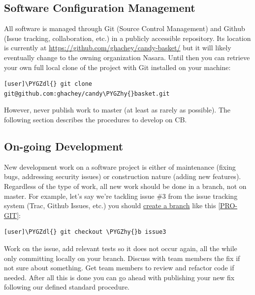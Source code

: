 \documentclass[letterpaper,10pt,english]{sphinxmanual}
\def\PYGZdl{\char`\$}
\def\PYGZhy{\char`\-}
\begin{document}
\subsection{Software Configuration Management}
\label{developer-guide:software-configuration-management}
All software is managed through Git (Source Control Management) and
Github (Issue tracking, collaboration, etc.) in a publicly accessible
repository. Its location is currently at
\href{https://github.com/ghachey/candy-basket/}{https://github.com/ghachey/candy-basket/} but it will likely
eventually change to the owning organization Nasara. Until then you
can retrieve your own full local clone of the project with Git
installed on your machine:

\begin{Verbatim}[commandchars=\\\{\}]
[user]\PYGZdl{} git clone git@github.com:ghachey/candy\PYGZhy{}basket.git
\end{Verbatim}

However, never publish work to master (at least as rarely as
possible). The following section describes the procedures to develop
on CB.


\subsection{On-going Development}
\label{developer-guide:ongoingdev}\label{developer-guide:on-going-development}
New development work on a software project is either of maintenance
(fixing bugs, addressing security issues) or construction nature
(adding new features). Regardless of the type of work, all new work
should be done in a branch, not on master. For example, let's say
we're tackling issue \#3 from the issue tracking system (Trac, Github
Issues, etc.) you should \href{http://www.git-scm.com/book/en/Git-Branching-Basic-Branching-and-Merging}{create a branch}
like this {\hyperref[developer-guide:pro-git]{{[}PRO-GIT{]}}}:

\begin{Verbatim}[commandchars=\\\{\}]
[user]\PYGZdl{} git checkout \PYGZhy{}b issue3
\end{Verbatim}

Work on the issue, add relevant tests so it does not occur again, all
the while only committing locally on your branch. Discuss with team
members the fix if not sure about something. Get team members to
review and refactor code if needed. After all this is done you can go
ahead with publishing your new fix following our defined standard
procedure.
\end{document}
